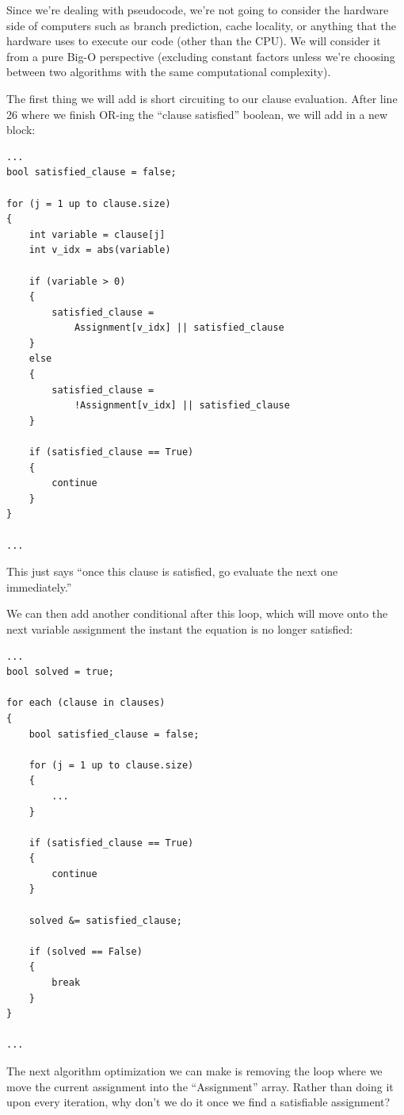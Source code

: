 \documentclass[oneside]{book}
\begin{document}
Since we're dealing with pseudocode, we're not going to consider the hardware
side of computers such as branch prediction, cache locality, or anything that
the hardware uses to execute our code (other than the CPU). We will consider
it from a pure Big-O perspective (excluding constant factors unless we're
choosing between two algorithms with the same computational complexity).

The first thing we will add is short circuiting to our clause evaluation. After
line 26 where we finish OR-ing the ``clause satisfied'' boolean, we will add in
a new block:

\begin{lstlisting}
...
bool satisfied_clause = false;

for (j = 1 up to clause.size)
{
    int variable = clause[j]
    int v_idx = abs(variable)

    if (variable > 0)
    {
        satisfied_clause =
            Assignment[v_idx] || satisfied_clause
    }
    else
    {
        satisfied_clause =
            !Assignment[v_idx] || satisfied_clause
    }

    if (satisfied_clause == True)
    {
        continue
    }
}

...
\end{lstlisting}

This just says ``once this clause is satisfied, go evaluate the next one
immediately.''

We can then add another conditional after this loop, which will move onto the
next variable assignment the instant the equation is no longer satisfied:

\begin{lstlisting}
...
bool solved = true;

for each (clause in clauses)
{
    bool satisfied_clause = false;

    for (j = 1 up to clause.size)
    {
        ...
    }

    if (satisfied_clause == True)
    {
        continue
    }

    solved &= satisfied_clause;

    if (solved == False)
    {
        break
    }
}

...
\end{lstlisting}

The next algorithm optimization we can make is removing the loop where we
move the current assignment into the ``Assignment'' array. Rather than doing it
upon every iteration, why don't we do it once we find a satisfiable assignment?
\end{document}
